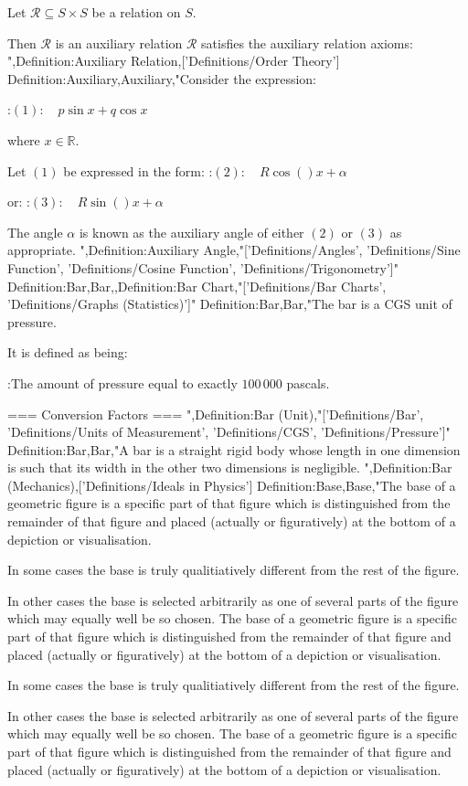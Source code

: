 Let $\mathcal R \subseteq S \times S$ be a relation on $S$.


Then $\mathcal R$ is an auxiliary relation  $\mathcal R$ satisfies the auxiliary relation axioms:
",Definition:Auxiliary Relation,['Definitions/Order Theory']
Definition:Auxiliary,Auxiliary,"Consider the expression:

:$(1): \quad p \sin x + q \cos x$

where $x \in \mathbb R$.

Let $(1)$ be expressed in the form:
:$(2): \quad R \cos \left(   \right){x + \alpha}$

or:
:$(3): \quad R \sin \left(   \right){x + \alpha}$


The angle $\alpha$ is known as the auxiliary angle of either $(2)$ or $(3)$ as appropriate.
",Definition:Auxiliary Angle,"['Definitions/Angles', 'Definitions/Sine Function', 'Definitions/Cosine Function', 'Definitions/Trigonometry']"
Definition:Bar,Bar,,Definition:Bar Chart,"['Definitions/Bar Charts', 'Definitions/Graphs (Statistics)']"
Definition:Bar,Bar,"The bar is a CGS unit of pressure.


It is defined as being:

:The amount of pressure equal to exactly $100 \, 000$ pascals.


=== Conversion Factors ===
",Definition:Bar (Unit),"['Definitions/Bar', 'Definitions/Units of Measurement', 'Definitions/CGS', 'Definitions/Pressure']"
Definition:Bar,Bar,"A bar is a straight rigid body whose length in one dimension is such that its width in the other two dimensions is negligible.
",Definition:Bar (Mechanics),['Definitions/Ideals in Physics']
Definition:Base,Base,"The base of a geometric figure is a specific part of that figure which is distinguished from the remainder of that figure and placed (actually or figuratively) at the bottom of a depiction or visualisation.

In some cases the base is truly qualitiatively different from the rest of the figure.

In other cases the base is selected arbitrarily as one of several parts of the figure which may equally well be so chosen.
The base of a geometric figure is a specific part of that figure which is distinguished from the remainder of that figure and placed (actually or figuratively) at the bottom of a depiction or visualisation.

In some cases the base is truly qualitiatively different from the rest of the figure.

In other cases the base is selected arbitrarily as one of several parts of the figure which may equally well be so chosen.
The base of a geometric figure is a specific part of that figure which is distinguished from the remainder of that figure and placed (actually or figuratively) at the bottom of a depiction or visualisation.

